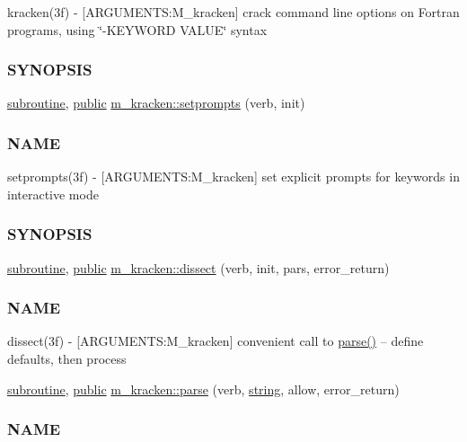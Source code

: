 \begin{DoxyCompactItemize}
\begin{DoxyCompactList}
kracken(3f) -\/ \mbox{[}A\+R\+G\+U\+M\+E\+N\+TS\+:M\+\_\+kracken\mbox{]} crack command line options on Fortran programs, using \char`\"{}-\/\+K\+E\+Y\+W\+O\+R\+D V\+A\+L\+U\+E\char`\"{} syntax \subsubsection*{S\+Y\+N\+O\+P\+S\+IS}\end{DoxyCompactList}\item 
\hyperlink{M__stopwatch_83_8txt_acfbcff50169d691ff02d4a123ed70482}{subroutine}, \hyperlink{M__stopwatch_83_8txt_a2f74811300c361e53b430611a7d1769f}{public} \hyperlink{namespacem__kracken_aab831b470a3107ca69833e717e95eaec}{m\+\_\+kracken\+::setprompts} (verb, init)
\begin{DoxyCompactList}\small\item\em \subsubsection*{N\+A\+ME}

setprompts(3f) -\/ \mbox{[}A\+R\+G\+U\+M\+E\+N\+TS\+:M\+\_\+kracken\mbox{]} set explicit prompts for keywords in interactive mode \subsubsection*{S\+Y\+N\+O\+P\+S\+IS}\end{DoxyCompactList}\item 
\hyperlink{M__stopwatch_83_8txt_acfbcff50169d691ff02d4a123ed70482}{subroutine}, \hyperlink{M__stopwatch_83_8txt_a2f74811300c361e53b430611a7d1769f}{public} \hyperlink{namespacem__kracken_a2cb376f8a8e26e489a45cafcda66ea3e}{m\+\_\+kracken\+::dissect} (verb, init, pars, error\+\_\+return)
\begin{DoxyCompactList}\small\item\em \subsubsection*{N\+A\+ME}

dissect(3f) -\/ \mbox{[}A\+R\+G\+U\+M\+E\+N\+TS\+:M\+\_\+kracken\mbox{]} convenient call to \hyperlink{namespacem__kracken_a495ed7db5c2d301c4d5e623b62a9c295}{parse()} -- define defaults, then process \end{DoxyCompactList}\item 
\hyperlink{M__stopwatch_83_8txt_acfbcff50169d691ff02d4a123ed70482}{subroutine}, \hyperlink{M__stopwatch_83_8txt_a2f74811300c361e53b430611a7d1769f}{public} \hyperlink{namespacem__kracken_a495ed7db5c2d301c4d5e623b62a9c295}{m\+\_\+kracken\+::parse} (verb, \hyperlink{what__overview_81_8txt_a74cb7e955273b9f9157b4f0c18a38849}{string}, allow, error\+\_\+return)
\begin{DoxyCompactList}\small\item\em \subsubsection*{N\+A\+ME}


\end{DoxyCompactList}
\end{DoxyCompactItemize}
